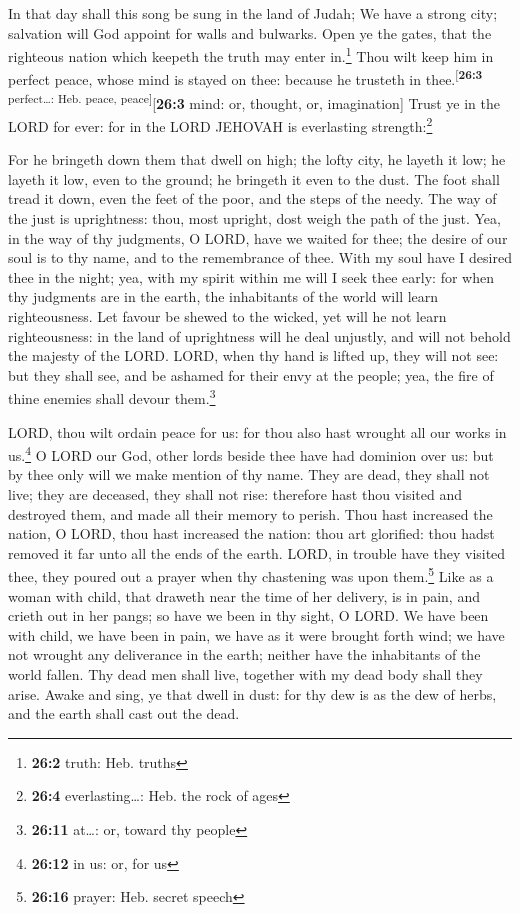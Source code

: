  In that day shall this song be sung in the land of Judah;
We have a strong city; salvation will God appoint for walls and
bulwarks.  Open ye the gates, that the righteous nation
which keepeth the truth may enter in.\footnote{\textbf{26:2} truth: Heb.
  truths}  Thou wilt keep him in perfect peace, whose mind
is stayed on thee: because he trusteth in
thee.\textsuperscript{{[}\textbf{26:3} perfect\ldots: Heb. peace,
peace{]}}{[}\textbf{26:3} mind: or, thought, or, imagination{]}
 Trust ye in the LORD for ever: for in the LORD JEHOVAH is
everlasting strength:\footnote{\textbf{26:4} everlasting\ldots: Heb. the
  rock of ages}

 For he bringeth down them that dwell on high; the lofty
city, he layeth it low; he layeth it low, even to the ground; he
bringeth it even to the dust.  The foot shall tread it
down, even the feet of the poor, and the steps of the needy.
 The way of the just is uprightness: thou, most upright,
dost weigh the path of the just.  Yea, in the way of thy
judgments, O LORD, have we waited for thee; the desire of our soul is to
thy name, and to the remembrance of thee.  With my soul
have I desired thee in the night; yea, with my spirit within me will I
seek thee early: for when thy judgments are in the earth, the
inhabitants of the world will learn righteousness.  Let
favour be shewed to the wicked, yet will he not learn righteousness: in
the land of uprightness will he deal unjustly, and will not behold the
majesty of the LORD.  LORD, when thy hand is lifted up,
they will not see: but they shall see, and be ashamed for their envy at
the people; yea, the fire of thine enemies shall devour them.\footnote{\textbf{26:11}
  at\ldots: or, toward thy people}

 LORD, thou wilt ordain peace for us: for thou also hast
wrought all our works in us.\footnote{\textbf{26:12} in us: or, for us}
 O LORD our God, other lords beside thee have had
dominion over us: but by thee only will we make mention of thy name.
 They are dead, they shall not live; they are deceased,
they shall not rise: therefore hast thou visited and destroyed them, and
made all their memory to perish.  Thou hast increased the
nation, O LORD, thou hast increased the nation: thou art glorified: thou
hadst removed it far unto all the ends of the earth. 
LORD, in trouble have they visited thee, they poured out a prayer when
thy chastening was upon them.\footnote{\textbf{26:16} prayer: Heb.
  secret speech}  Like as a woman with child, that
draweth near the time of her delivery, is in pain, and crieth out in her
pangs; so have we been in thy sight, O LORD.  We have
been with child, we have been in pain, we have as it were brought forth
wind; we have not wrought any deliverance in the earth; neither have the
inhabitants of the world fallen.  Thy dead men shall
live, together with my dead body shall they arise. Awake and sing, ye
that dwell in dust: for thy dew is as the dew of herbs, and the earth
shall cast out the dead.

